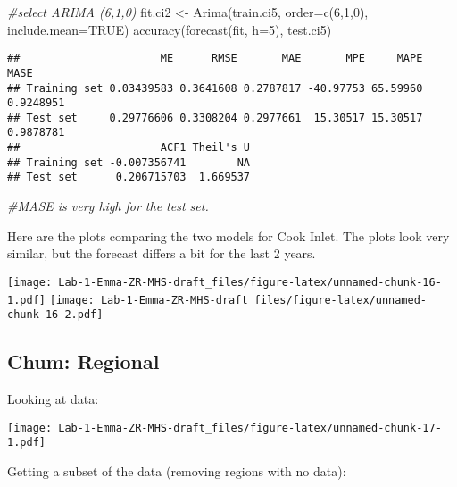 \documentclass[
]{article}
\newenvironment{Shaded}{\begin{snugshade}}{\end{snugshade}}
\newcommand{\AttributeTok}[1]{\textcolor[rgb]{0.77,0.63,0.00}{#1}}
\newcommand{\CommentTok}[1]{\textcolor[rgb]{0.56,0.35,0.01}{\textit{#1}}}
\newcommand{\ConstantTok}[1]{\textcolor[rgb]{0.00,0.00,0.00}{#1}}
\newcommand{\DecValTok}[1]{\textcolor[rgb]{0.00,0.00,0.81}{#1}}
\newcommand{\FunctionTok}[1]{\textcolor[rgb]{0.00,0.00,0.00}{#1}}
\newcommand{\NormalTok}[1]{#1}
\newcommand{\OtherTok}[1]{\textcolor[rgb]{0.56,0.35,0.01}{#1}}
\begin{document}
\begin{Shaded}
\begin{Highlighting}[]
\CommentTok{\#select ARIMA (6,1,0)}
\NormalTok{fit.ci2 }\OtherTok{\textless{}{-}} \FunctionTok{Arima}\NormalTok{(train.ci5, }\AttributeTok{order=}\FunctionTok{c}\NormalTok{(}\DecValTok{6}\NormalTok{,}\DecValTok{1}\NormalTok{,}\DecValTok{0}\NormalTok{), }\AttributeTok{include.mean=}\ConstantTok{TRUE}\NormalTok{)}
\FunctionTok{accuracy}\NormalTok{(}\FunctionTok{forecast}\NormalTok{(fit, }\AttributeTok{h=}\DecValTok{5}\NormalTok{), test.ci5)}
\end{Highlighting}
\end{Shaded}

\begin{verbatim}
##                      ME      RMSE       MAE       MPE     MAPE      MASE
## Training set 0.03439583 0.3641608 0.2787817 -40.97753 65.59960 0.9248951
## Test set     0.29776606 0.3308204 0.2977661  15.30517 15.30517 0.9878781
##                      ACF1 Theil's U
## Training set -0.007356741        NA
## Test set      0.206715703  1.669537
\end{verbatim}

\begin{Shaded}
\begin{Highlighting}[]
\CommentTok{\#MASE is very high for the test set.}
\end{Highlighting}
\end{Shaded}

Here are the plots comparing the two models for Cook Inlet. The plots
look very similar, but the forecast differs a bit for the last 2 years.

\texttt{[image: Lab-1-Emma-ZR-MHS-draft\_files/figure-latex/unnamed-chunk-16-1.pdf]}
\texttt{[image: Lab-1-Emma-ZR-MHS-draft\_files/figure-latex/unnamed-chunk-16-2.pdf]}

\hypertarget{chum-regional}{%
\subsection{Chum: Regional}\label{chum-regional}}

Looking at data:

\texttt{[image: Lab-1-Emma-ZR-MHS-draft\_files/figure-latex/unnamed-chunk-17-1.pdf]}

Getting a subset of the data (removing regions with no data):
\end{document}
